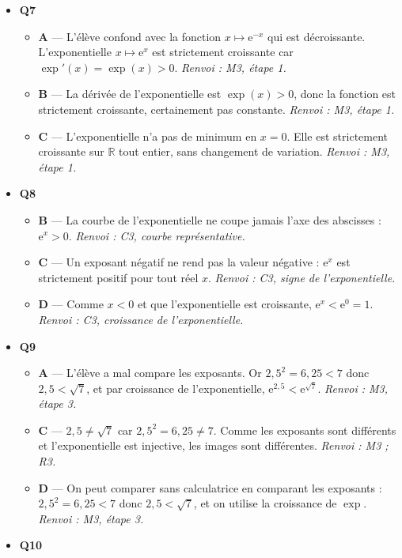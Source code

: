\begin{itemize}
  \item \textbf{Q7}
  \begin{itemize}
    \item \textbf{A} — L'élève confond avec la fonction $x \mapsto \mathrm{e}^{-x}$ qui est décroissante. L'exponentielle $x \mapsto \mathrm{e}^x$ est strictement croissante car $\exp'(x) = \exp(x) > 0$. \emph{Renvoi : M3, étape 1.}
    \item \textbf{B} — La dérivée de l'exponentielle est $\exp(x) > 0$, donc la fonction est strictement croissante, certainement pas constante. \emph{Renvoi : M3, étape 1.}
    \item \textbf{C} — L'exponentielle n'a pas de minimum en $x = 0$. Elle est strictement croissante sur $\mathbb{R}$ tout entier, sans changement de variation. \emph{Renvoi : M3, étape 1.}
  \end{itemize}
  \item \textbf{Q8}
  \begin{itemize}
    \item \textbf{B} — La courbe de l'exponentielle ne coupe jamais l'axe des abscisses : $\mathrm{e}^x>0$. \emph{Renvoi : C3, courbe représentative.}
    \item \textbf{C} — Un exposant négatif ne rend pas la valeur négative : $\mathrm{e}^x$ est strictement positif pour tout réel $x$. \emph{Renvoi : C3, signe de l'exponentielle.}
    \item \textbf{D} — Comme $x<0$ et que l'exponentielle est croissante, $\mathrm{e}^x<\mathrm{e}^0=1$. \emph{Renvoi : C3, croissance de l'exponentielle.}
  \end{itemize}
  \item \textbf{Q9}
  \begin{itemize}
    \item \textbf{A} — L'élève a mal compare les exposants. Or $2{,}5^2 = 6{,}25 < 7$ donc $2{,}5 < \sqrt{7}$, et par croissance de l'exponentielle, $\mathrm{e}^{2{,}5} < \mathrm{e}^{\sqrt{7}}$. \emph{Renvoi : M3, étape 3.}
    \item \textbf{C} — $2{,}5 \neq \sqrt{7}$ car $2{,}5^2 = 6{,}25 \neq 7$. Comme les exposants sont différents et l'exponentielle est injective, les images sont différentes. \emph{Renvoi : M3 ; R3.}
    \item \textbf{D} — On peut comparer sans calculatrice en comparant les exposants : $2{,}5^2 = 6{,}25 < 7$ donc $2{,}5 < \sqrt{7}$, et on utilise la croissance de $\exp$. \emph{Renvoi : M3, étape 3.}
  \end{itemize}
  \item \textbf{Q10}

\end{itemize}
